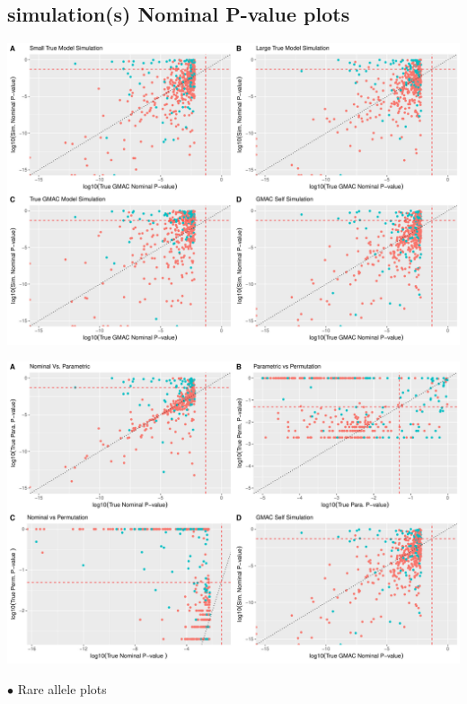 \documentclass[
]{article}
\begin{document}
\hypertarget{simulations-nominal-p-value-plots}{%
\subsection{simulation(s) Nominal P-value
plots}\label{simulations-nominal-p-value-plots}}

\includegraphics{12_15_2021_GMAC_plots_all_trios_files/figure-latex/unnamed-chunk-6-1.pdf}

\includegraphics{12_15_2021_GMAC_plots_all_trios_files/figure-latex/unnamed-chunk-7-1.pdf}

\(\bullet\) Rare allele plots
\end{document}
